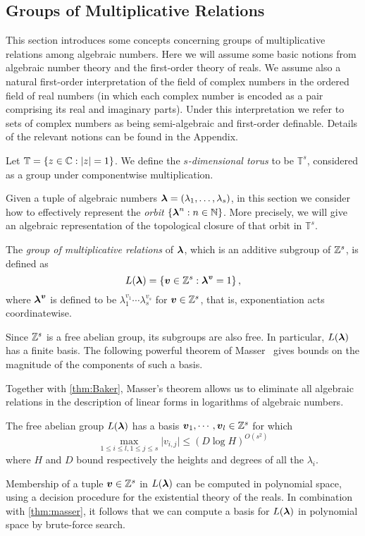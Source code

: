 \subsection{Groups of Multiplicative Relations}
\label{sec:mult}

This section introduces some concepts concerning groups of
multiplicative relations among algebraic numbers.  Here we will assume
some basic notions from algebraic number theory and the first-order
theory of reals.  We assume also a natural first-order interpretation of
the field of complex numbers in the ordered field of real numbers (in
which each complex number is encoded as a pair comprising its real and
imaginary parts).  Under this interpretation we refer to sets of
complex numbers as being semi-algebraic and first-order definable.
Details of the relevant notions can be found in the Appendix.

Let $\mathbb{T}=\lbrace z\in\mathbb{C}: \lvert z\rvert =1\rbrace$.  We
define the \emph{$s$-dimensional torus} to be $\mathbb{T}^s$,
considered as a group under componentwise multiplication.

Given a tuple of algebraic numbers
$\boldsymbol\lambda=(\lambda_1,\ldots,\lambda_s)$, in this section we
consider how to effectively represent the \emph{orbit} $\{
\boldsymbol\lambda^n : n \in \mathbb{N}\}$.  More
precisely, we will give an algebraic representation of the topological
closure of that orbit in $\mathbb{T}^s$.

The \emph{group of multiplicative relations} of
$\boldsymbol{\lambda}$, which is an additive subgroup of
$\mathbb{Z}^s$, is defined as
\begin{equation*}
L(\boldsymbol{\lambda})=\lbrace \boldsymbol{v}\in \mathbb{Z}^s : \boldsymbol\lambda^{\boldsymbol v}=1 \rbrace \, ,
\end{equation*}
where $\boldsymbol\lambda^{\boldsymbol v}$ is defined to be
$\lambda_1^{v_1}\cdots\lambda_s^{v_s}$ for $\boldsymbol{v}\in \mathbb{Z}^s$, that is, exponentiation acts
coordinatewise.

Since $\mathbb{Z}^s$ is a free abelian group, its subgroups are also
free.  In particular, $L(\boldsymbol\lambda)$ has a finite basis. The
following powerful theorem of Masser~\cite{Mas88} gives bounds on the
magnitude of the components of such a basis.

Together with \cref{thm:Baker}, Masser's theorem allows us to eliminate all algebraic relations in the description of linear forms in logarithms of algebraic numbers.

\begin{theorem}[Masser]
\label{thm:masser}
The free abelian group $L(\boldsymbol{\lambda})$ has a basis $\boldsymbol{v}_1,\cdots,\boldsymbol{v}_l\in\mathbb{Z}^s$ for which
\[ \max\limits_{1\leq i\leq l,1\leq j\leq s} \lvert v_{i,j} \rvert \leq (D\log H)^{O(s^2)} \]
where $H$ and $D$ bound respectively the heights and degrees of all the $\lambda_i$.
\end{theorem}
Membership of a tuple $\boldsymbol{v}\in \mathbb{Z}^s$ in
$L(\boldsymbol{\lambda})$ can be computed in polynomial space, using a
decision procedure for the existential theory of the reals.  In
combination with \cref{thm:masser}, it follows that we can compute
a basis for $L(\boldsymbol{\lambda})$ in polynomial space by
brute-force search.

